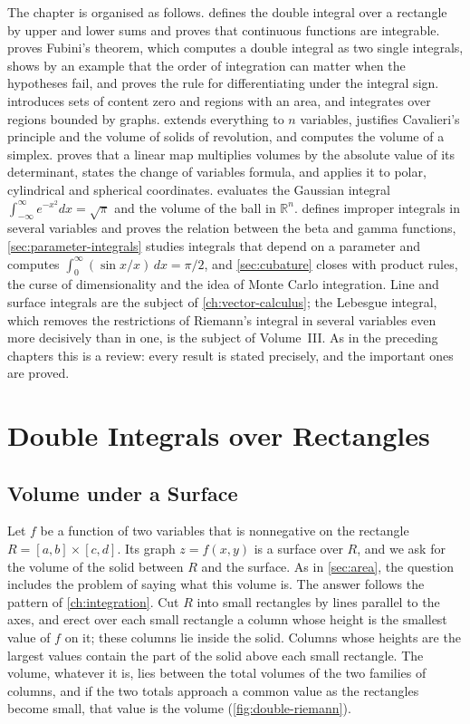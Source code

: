 The chapter is organised as follows.  defines the double integral over a rectangle by upper and lower sums and proves that continuous functions are integrable.  proves Fubini's theorem, which computes a double integral as two single integrals, shows by an example that the order of integration can matter when the hypotheses fail, and proves the rule for differentiating under the integral sign.  introduces sets of content zero and regions with an area, and integrates over regions bounded by graphs.  extends everything to $n$ variables, justifies Cavalieri's principle and the volume of solids of revolution, and computes the volume of a simplex.  proves that a linear map multiplies volumes by the absolute value of its determinant, states the change of variables formula, and applies it to polar, cylindrical and spherical coordinates.  evaluates the Gaussian integral $\int_{-\infty}^\infty e^{-x^2}dx=\sqrt\pi$ and the volume of the ball in $\mathbb R^n$.  defines improper integrals in several variables and proves the relation between the beta and gamma functions, \cref{sec:parameter-integrals} studies integrals that depend on a parameter and computes $\int_0^\infty(\sin x/x)\,dx=\pi/2$, and \cref{sec:cubature} closes with product rules, the curse of dimensionality and the idea of Monte Carlo integration. Line and surface integrals are the subject of \cref{ch:vector-calculus}; the Lebesgue integral, which removes the restrictions of Riemann's integral in several variables even more decisively than in one, is the subject of Volume~III. As in the preceding chapters this is a review: every result is stated precisely, and the important ones are proved.

\section{Double Integrals over Rectangles}
\label{sec:double-rectangles}

\subsection{Volume under a Surface}

Let $f$ be a function of two variables that is nonnegative on the rectangle $R=[a,b]\times[c,d]$. Its graph $z=f(x,y)$ is a surface over $R$, and we ask for the volume of the solid between $R$ and the surface. As in \cref{sec:area}, the question includes the problem of saying what this volume is. The answer follows the pattern of \cref{ch:integration}. Cut $R$ into small rectangles by lines parallel to the axes, and erect over each small rectangle a column whose height is the smallest value of $f$ on it; these columns lie inside the solid. Columns whose heights are the largest values contain the part of the solid above each small rectangle. The volume, whatever it is, lies between the total volumes of the two families of columns, and if the two totals approach a common value as the rectangles become small, that value is the volume (\cref{fig:double-riemann}).

